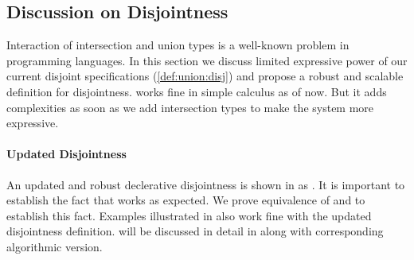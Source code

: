 \begin{comment}
\begin{proof}
  By induction on first reduction relation and inverting second reduction relation subsequently.
  All cases are trivial to solve by simple inversions except:
  \begin{itemize}
    \item Case \rref{typ-typeof} requires \cref{lemma:union:check-both-disj-false}.
  \end{itemize}
\end{proof}

\begin{lemma}[check-both-disj-false]
\label{lemma:union:check-both-disj-false}
If \ $[[A *s B]]$ \ and \ $[[G |- p <= A]]$ \ and \ $[[G |- p <= B]]$ \ then \ False.
\end{lemma}
\end{comment}



\subsection{Discussion on Disjointness}
\label{sec:union:discussion}
Interaction of intersection and union types is a well-known problem in programming languages.
In this section we discuss limited expressive power of our current disjoint specifications
(\cref{def:union:disj}) and propose a robust and scalable definition for disjointness.
 works fine in simple calculus as of now. But it adds complexities as soon as we add
intersection types to make the system more expressive.

\paragraph{Updated Disjointness}
An updated and robust declerative disjointness is shown in  as .
It is important to establish the fact that  works as expected.
We prove equivalence of  and  to establish this fact.
Examples illustrated in  also work fine with the updated disjointness definition.
 will be discussed in detail in  along with corresponding
algorithmic version.

